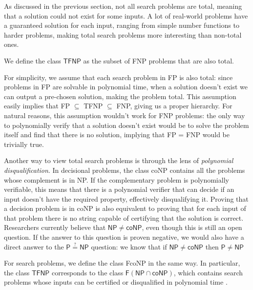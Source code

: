 \newpage

As discussed in the previous section, not all search problems are total, meaning that a solution could not exist for some inputs. A lot of real-world problems have a guaranteed solution for each input, ranging from simple number functions to harder problems, making total search problems more interesting than non-total ones.

\begin{definition}
 We define the class $\mathsf{TFNP}$ as the subset of \textsf{FNP} problems that are also total.
\end{definition}

For simplicity, we assume that each search problem in \textsf{FP} is also total: since problems in \textsf{FP} are solvable in polynomial time, when a solution doesn't exist we can output a pre-chosen  solution, making the problem total. This assumption easily implies that \textsf{FP} $\subseteq$ \textsf{TFNP} $\subseteq$ \textsf{FNP}, giving us a proper hierarchy. For natural reasons, this assumption wouldn't work for \textsf{FNP} problems: the only way to polynomially verify that a solution doesn't exist would be to solve the problem itself and find that there is no solution, implying that \textsf{FP} = \textsf{FNP} would be trivially true.

Another way to view total search problems is through the lens of \textit{polynomial disqualification}. In decisional problems, the class \textsf{coNP} contains all the problems whose complement is in \textsf{NP}. If the complementary problem is polynomially verifiable, this means that there is a polynomial verifier that can decide if an input doesn't have the required property, effectively disqualifying it. Proving that a decision problem is in \textsf{coNP} is also equivalent to proving that for each input of that problem there is no string capable of certifying that the solution is correct. Researchers currently believe that $\mathsf{NP} \neq \mathsf{coNP}$, even though this is still an open question. If the answer to this question is proven negative, we would also have a direct answer to the $\mathsf{P} \stackrel{?}{=} \mathsf{NP}$ question: we know that if $\mathsf{NP} \neq \mathsf{coNP}$ then $\mathsf{P} \neq \mathsf{NP}$ \cite{complexity_arora_barak, sipser_computation}

For search problems, we define the class \textsf{FcoNP} in the same way. In particular, the class $\textsf{TFNP}$ corresponds to the class $\mathsf{F}(\mathsf{NP} \cap \mathsf{coNP})$, which contains search problems whose inputs can be certified or disqualified in polynomial time \cite{tfnp_f_np_conp}.

